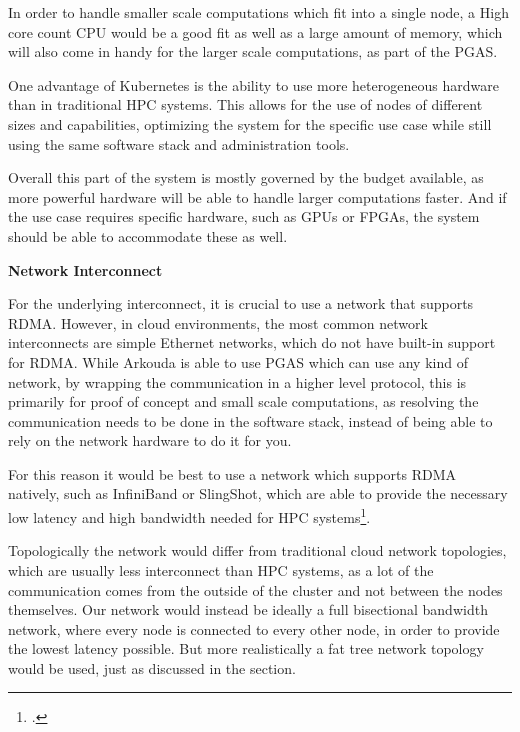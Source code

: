 In order to handle smaller scale computations which fit into a single node,
a High core count CPU would be a good fit as well as a large amount of memory,
which will also come in handy for the larger scale computations, as part of the \ac{PGAS}.

One advantage of Kubernetes is the ability to use more heterogeneous hardware than in traditional \ac{HPC} systems.
This allows for the use of nodes of different sizes and capabilities, optimizing the system for the specific use case while
still using the same software stack and administration tools.

Overall this part of the system is mostly governed by the budget available,
as more powerful hardware will be able to handle larger computations faster.
And if the use case requires specific hardware, such as \ac{GPU}s or \ac{FPGA}s,
the system should be able to accommodate these as well.

\textbf{Network Interconnect}
\label{sec:suggarch_network}

For the underlying interconnect, it is crucial to use a network that supports \ac{RDMA}. However, in cloud environments, the most common network interconnects are simple Ethernet networks,
which do not have built-in support for \ac{RDMA}.
While Arkouda is able to use \ac{PGAS} which can use any kind of network,
by wrapping the communication in a higher level protocol, this is primarily for proof of concept and small scale computations,
as resolving the communication needs to be done in the software stack,
instead of being able to rely on the network hardware to do it for you.

For this reason it would be best to use a network which supports \ac{RDMA} natively,
such as InfiniBand or SlingShot, which are able to provide the necessary low latency and high bandwidth
needed for \ac{HPC} systems\footcite{desensiInDepthAnalysisSlingshot2020a}.

Topologically the network would differ from traditional cloud network topologies,
which are usually less interconnect than \ac{HPC} systems,
as a lot of the communication comes from the outside of the cluster and not between the nodes themselves.
Our network would instead be ideally a full bisectional bandwidth network,
where every node is connected to every other node, in order to provide the lowest latency possible.
But more realistically a fat tree network topology would be used, just as discussed in the  section.



